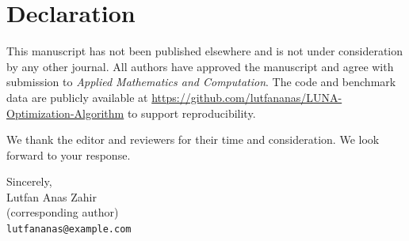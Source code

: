 \documentclass[11pt,a4paper]{article}
\begin{document}
\section*{Declaration}

This manuscript has not been published elsewhere and is not under consideration by any other journal. All authors have approved the manuscript and agree with submission to \textit{Applied Mathematics and Computation}. The code and benchmark data are publicly available at \url{https://github.com/lutfananas/LUNA-Optimization-Algorithm} to support reproducibility.

We thank the editor and reviewers for their time and consideration. We look forward to your response.

\vspace{1em}
\noindent Sincerely,\\
Lutfan Anas Zahir\\
(corresponding author)\\
\texttt{lutfananas@example.com}
\end{document}
